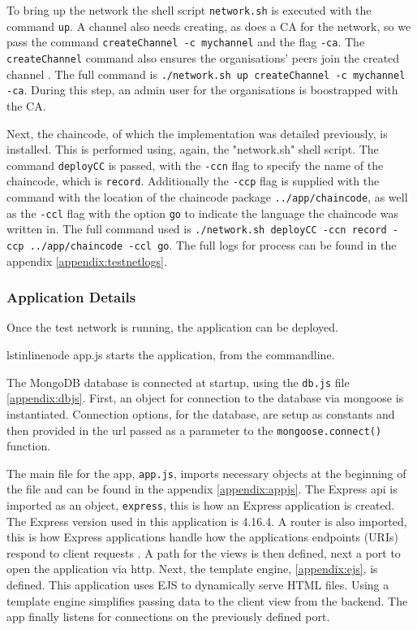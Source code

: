 To bring up the network the shell script \lstinline{network.sh} is executed with the command \lstinline{up}. 
A channel also needs creating, as does a CA for the network, so we pass the command \lstinline{createChannel -c mychannel} and the flag \lstinline{-ca}. 
The \lstinline{createChannel} command also ensures the organisations' peers join the created channel \cite{noauthor_using_nodate}.
The full command is \lstinline{./network.sh up createChannel -c mychannel -ca}.
During this step, an admin user for the organisations is boostrapped with the CA.  

Next, the chaincode, of which the implementation was detailed previously, is installed. 
This is performed using, again, the "network.sh" shell script. 
The command \lstinline{deployCC} is passed, with the \lstinline{-ccn} flag to specify the name of the chaincode, which is \lstinline{record}. 
Additionally the \lstinline{-ccp} flag is supplied with the command with the location of the chaincode package \lstinline{../app/chaincode}, as well as the \lstinline{-ccl} flag with the option \lstinline{go} to indicate the language the chaincode was written in. 
The full command used is \lstinline{./network.sh deployCC -ccn record -ccp ../app/chaincode -ccl go}. 
The full logs for process can be found in the appendix \ref{appendix:testnetlogs}.

\subsubsection{Application Details}
Once the test network is running, the application can be deployed. 

lstinline{node app.js} starts the application, from the commandline. 

The MongoDB database is connected at startup, using the \lstinline{db.js} file \ref{appendix:dbjs}. 
First, an object for connection to the database via mongoose is instantiated. 
Connection options, for the database, are setup as constants and then provided in the url passed as a parameter to the \lstinline{mongoose.connect()} function. 

The main file for the app, \lstinline{app.js}, imports necessary objects at the beginning of the file and can be found in the appendix \ref{appendix:appjs}. 
The Express api is imported as an object, \lstinline{express}, this is how an Express application is created. \cite{noauthor_express_nodate}
The Express version used in this application is 4.16.4. 
A router is also imported, this is how Express applications handle how the applications endpoints (URIs) respond to client requests \cite{routing_express_nodate}.
A path for the views is then defined, next a port to open the application via http. 
Next, the template engine, \ref{appendix:ejs}, is defined. 
This application uses EJS to dynamically serve HTML files. 
Using a template engine simplifies passing data to the client view from the backend. 
The app finally listens for connections on the previously defined port. 

